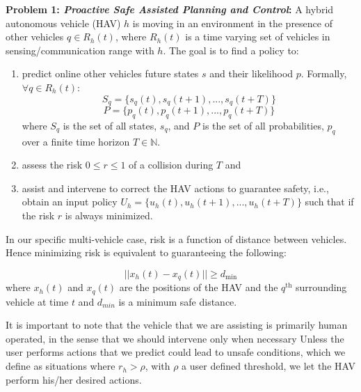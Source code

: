 \documentclass[letterpaper, 10 pt, conference]{ieeeconf}  %
\newcommand\NB[1]{$\spadesuit$\footnote{NB: #1}}
\newcommand*{\N}{\mathbb{N}}
\begin{document}
\textbf{Problem 1: \textit{Proactive Safe Assisted Planning and Control}:} 
      A hybrid autonomous vehicle (HAV) $h$ is moving in an environment in the presence of other vehicles $q \in R_h(t)$, where $R_h(t)$ is a time varying set of vehicles in sensing/communication range with $h$. The goal is to find a policy to:
    \begin{enumerate}
        \item  predict online other vehicles future states $s$ and their likelihood $p$. Formally, $\forall q \in R_h(t)$:
    \begin{equation}
   S_q=\{{s_q(t), s_q(t+1),..., s_q(t+T)}\}
       \end{equation}
       \begin{equation}
   P=\{{p_q(t), p_q(t+1),..., p_q(t+T)}\}
    \end{equation}
     where $S_q$ is the set of all states, $s_q$, and $P$ is the set of all probabilities, $p_q$ over a finite time horizon $T\in\N$.  
    \item assess the risk $0\leq r \leq1$ of a collision during $T$ and
    \item assist and intervene to correct the HAV actions to guarantee safety, i.e., obtain an input policy $U_h=\{{u_h(t), u_h(t+1),..., u_h(t+T)}\}$ such that if the risk $r$ is always minimized. 
    \end{enumerate}
   In our specific multi-vehicle case, risk is a function of distance between vehicles. Hence minimizing risk is equivalent to guaranteeing the following:
    
    \begin{equation}
        ||{x_h(t)-x_q(t)}|| \geq d_{\textrm{min}}
    \end{equation}
     where $x_h(t)$ and $x_q(t)$ are the positions of the HAV and the $q^{\textrm{th}}$ surrounding vehicle at time $t$ and $d_{min}$ is a minimum safe distance.    
    
    It is important to note that the vehicle that we are assisting is primarily human operated, in the sense that we should intervene only when necessary %
    Unless the user performs actions that we predict could lead to unsafe conditions, which we define as situations where $r_h>\rho$, with $\rho$ a user defined threshold, we let the HAV perform his/her desired actions.
\end{document}
